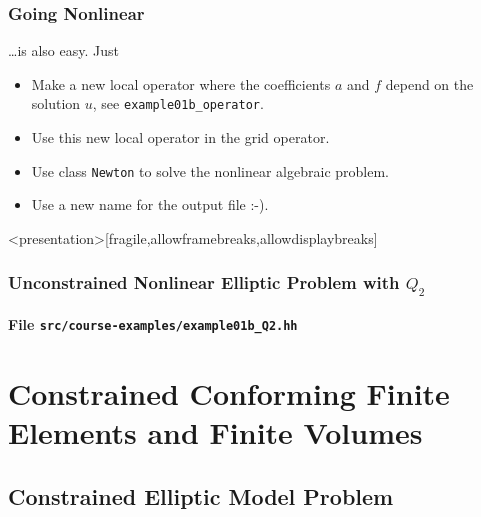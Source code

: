 \begin{frame}
\frametitle{Going Nonlinear}
\ldots is also easy. Just
\begin{itemize}
\item Make a new local operator where the coefficients $a$ and $f$ depend on the solution $u$,
see \lstinline{example01b_operator}.
\item Use this new local operator in the grid operator.
\item Use class \lstinline{Newton} to solve the nonlinear algebraic problem.
\item Use a new name for the output file :-).
\end{itemize}
\end{frame}

\begin{frame}<presentation>[fragile,allowframebreaks,allowdisplaybreaks]
\frametitle<presentation>{Unconstrained Nonlinear Elliptic Problem with $Q_2$}
\framesubtitle<presentation>{File \texttt{src/course-examples/example01b\_Q2.hh}}

\end{frame}

\section{Constrained Conforming Finite Elements and Finite Volumes}\label{Sec:ConstrainedEllipticProblems}

\subsection{Constrained Elliptic Model Problem}

